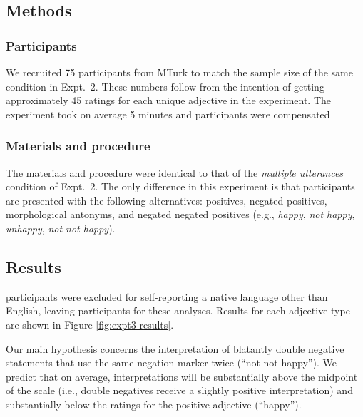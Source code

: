 \documentclass[floatsintext,doc]{apa6}
\begin{document}
\subsection{Methods}

\subsubsection{Participants}\label{participants-3}

We recruited 75 participants from MTurk to match the sample size of the same condition in Expt.~2.
These numbers follow from the intention of getting approximately 45 ratings for each unique adjective in the experiment.
The experiment took on average 5 minutes and participants were compensated 

\subsubsection{Materials and procedure}\label{materials-3}

The materials and procedure were identical to that of the \emph{multiple utterances} condition of Expt.~2.
The only difference in this experiment is that participants are presented with the following alternatives: positives, negated positives, morphological antonyms, and negated negated positives (e.g., \emph{happy}, \emph{not happy}, \emph{unhappy}, \emph{not not happy}).

\subsection{Results}

 participants were excluded for self-reporting a native language other than English, leaving  participants for these analyses.
Results for each adjective type are shown in Figure \ref{fig:expt3-results}.

Our main hypothesis concerns the interpretation of blatantly double negative statements that use the same negation marker twice (``not not happy''). We predict that on average, interpretations will be substantially above the midpoint of the scale (i.e., double negatives receive a slightly positive interpretation) and substantially below the ratings for the positive adjective (``happy''). 
\end{document}
